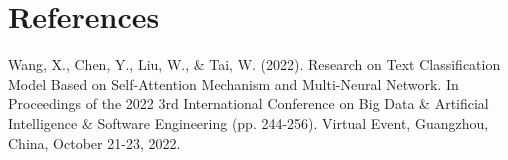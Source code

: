 \section*{References}

Wang, X., Chen, Y., Liu, W., \& Tai, W. (2022). Research on Text Classification Model Based on Self-Attention Mechanism and Multi-Neural Network. In Proceedings of the 2022 3rd International Conference on Big Data \& Artificial Intelligence \& Software Engineering (pp. 244-256). Virtual Event, Guangzhou, China, October 21-23, 2022.